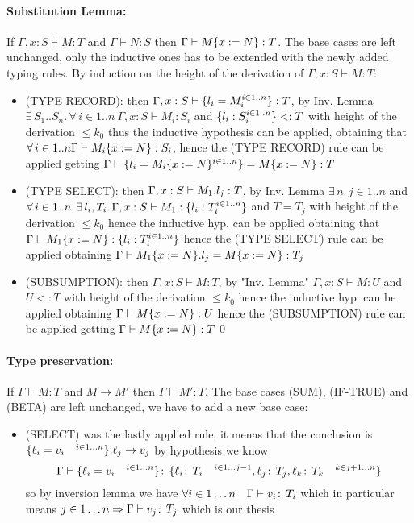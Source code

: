 \paragraph*{Substitution Lemma:\\}
If \(\Gamma, x: S \vdash M: T\) and \(\Gamma \vdash N: S\) then \(\Gamma
\vdash M\{x:=N\}: T\).  The base cases are left unchanged, only the
inductive ones has to be extended with the newly added typing rules.
By induction on the height of the derivation of \(\Gamma, x: S \vdash
M: T\):
\begin{itemize}
\item (TYPE RECORD): then \(\Gamma, x: S \vdash \{l_i=M_i^{i \in
    1..n}\}: T\), by Inv. Lemma \(\exists\, S_1..S_n.\,\forall\, i \in
  1..n\ \Gamma, x: S \vdash M_i: S_i\) and \(\{l_i: S_i^{i \in
      1..n}\} <: T\) with height of the derivation \(\le k_0\) thus the
  inductive hypothesis can be applied, obtaining that \(\forall\, i \in
  1..n \Gamma \vdash M_i\{x:=N\}: S_i\), hence the (TYPE RECORD)
  rule can be applied getting \(\Gamma \vdash \{l_i =
    M_i\{x:=N\}^{i \in 1..n}\} = M\{x:=N\} : T\)
\item (TYPE SELECT): then \(\Gamma, x: S \vdash M_1.l_j: T\), by
  Inv. Lemma \(\exists\, n.\, j \in 1..n\) and \(\forall\, i \in 1..n.\,
  \exists\, l_i, T_i.\, \Gamma, x: S \vdash M_1: \{l_i: T_i^{i \in
      1..n}\}\) and \(T = T_j\) with height of the derivation \(\le k_0\)
  hence the inductive hyp. can be applied obtaining that \(\Gamma
  \vdash M_1\{x:=N\}: \{l_i: T_i^{i \in 1..n}\}\) hence the
  (TYPE SELECT) rule can be applied obtaining \(\Gamma \vdash
  M_1\{x:=N\}.l_j = M\{x:=N\}: T_j\)
\item (SUBSUMPTION): then \(\Gamma, x:S \vdash M: T\), by "Inv. Lemma"
  \(\Gamma, x: S \vdash M: U\) and \(U <: T\) with height of the
  derivation \(\le k_0\) hence the inductive hyp. can be applied
  obtaining \(\Gamma \vdash M\{x:=N\}: U\) hence the (SUBSUMPTION)
  rule can be applied getting \(\Gamma \vdash M\{x:=N\}: T\)\qed
\end{itemize}

\paragraph*{Type preservation:\\}
If \(\Gamma \vdash M: T\) and \(M \to M'\) then \(\Gamma \vdash M': T\).
The base cases (SUM), (IF-TRUE) and (BETA) are left unchanged, we have
to add a new base case:
\begin{itemize}
\item (SELECT) was the lastly applied rule, it menas that the
  conclusion is \(\{\ell_i = v_i \quad^{i\in 1\dots n}\}.\ell_j \to
  v_j\) by hypothesis we know \[\Gamma \vdash \{\ell_i = v_i
    \quad^{i\in 1\dots n}\} \!:\,\{\ell_i \!:\,T_i \quad^{i\in
        1\dots j-1}, \ell_j \!:\,T_j, \ell_k \!:\,T_k \quad^{k\in
        j+1\dots n}\}\] so by inversion lemma we have \(\forall i \in
  1 \dots n \quad \Gamma\vdash v_i\!:\,T_i\) which in particular
  means \(j\in 1\dots n \Rightarrow \Gamma \vdash v_j \!:\,T_j\)
  which is our thesis
\end{itemize}

